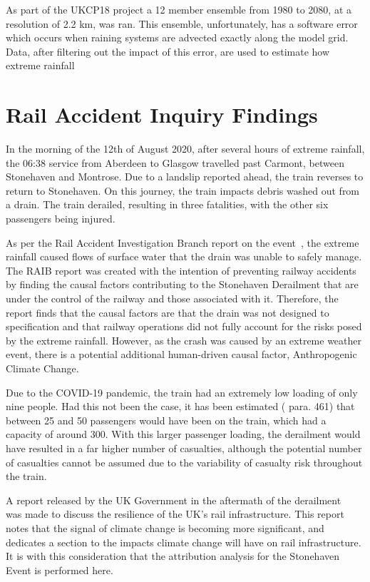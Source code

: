 \documentclass[11pt,a4paper]{article}
\begin{document}
   As part of the UKCP18 project\parencite{ukcp2019cpm} a 12 member ensemble from 1980 to 2080, at a resolution of 2.2 km, was ran.  This ensemble, unfortunately, has a software error which occurs when raining systems are advected exactly along the model grid.  Data, after filtering out the impact of this error, are used to estimate how extreme rainfall




\section{Rail Accident Inquiry Findings}\label{sec:stonederail}
In the morning of the 12th of August 2020,
after several hours of extreme rainfall,
the 06:38 service from Aberdeen to Glasgow travelled past Carmont,
between Stonehaven and Montrose.
Due to a landslip reported ahead,
the train reverses to return to Stonehaven.
On this journey,
the train impacts debris washed out from a drain.
The train derailed,
resulting in three fatalities,
with the other six passengers being injured.

As per the Rail Accident Investigation Branch report on the event~\parencite{RAIB_2022},
the extreme rainfall caused flows of surface water that the drain was unable to safely manage.
The RAIB report was created with the intention of preventing railway accidents by finding the causal
factors contributing to the Stonehaven Derailment that are under the control of the railway
and those associated with it.
Therefore,
the report finds that the causal factors are that the drain was not designed to specification
and that railway operations did not fully account for the risks posed by the extreme rainfall.
However,
as the crash was caused by an extreme weather event,
there is a potential additional human-driven causal factor, Anthropogenic Climate Change.

Due to the COVID-19 pandemic,
the train had an extremely low loading of only nine people.
Had this not been the case,
it has been estimated (\cite{RAIB_2022} para. 461) that between 25 and 50 passengers would have been on the train,
which had a capacity of around 300.
With this larger passenger loading,
the derailment would have resulted in a far higher number of casualties,
although the potential number of casualties cannot be assumed due to the variability of casualty risk throughout the train.

A report released by the UK Government in the aftermath of the derailment~\cite{NR_DfT_2021}
was made to discuss the resilience of the UK's rail infrastructure.
This report notes that the signal of climate change is becoming more significant,
and dedicates a section to the impacts climate change will have on rail infrastructure.
It is with this consideration that the attribution analysis for the Stonehaven Event is performed here.
\end{document}
